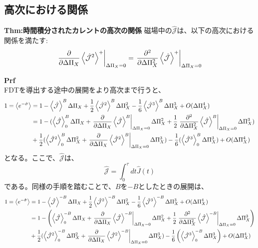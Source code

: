 \documentclass[a4paper,11pt]{jsarticle}
\begin{document}
\subsection{高次における関係}
\begin{itembox}[l]{\textbf{Thm:時間積分されたカレントの高次の関係}}
    磁場中の$\hat{\mathcal{J}}$は、以下の高次における関係を満たす:
    \begin{align}
        \left.\pdv{\Delta \Pi_X} \ev{\hat{\mathcal{J}}^2}^+\right|_{\Delta \Pi_X = 0} = \left.\pdv[2]{\Delta \Pi_X} \ev{\hat{\mathcal{J}}}^+\right|_{\Delta \Pi_X = 0}
    \end{align}

\end{itembox}
\textbf{Prf}\\
FDTを導出する途中の展開をより高次まで行うと、
\begin{align}
    1=\ev{e^{-\hat{\sigma}}}&= 1-\ev{\hat{\mathcal{J}}}^B \Delta \Pi_X + \frac{1}{2}\ev{\hat{\mathcal{J}}^2}^B \Delta \Pi_X ^2- \frac{1}{6}\ev{\hat{\mathcal{J}}^3}^B \Delta \Pi_X ^3 + O(\Delta \Pi_X ^4)\\
    &=1-(\ev{\hat{\mathcal{J}}}^B_0 \Delta \Pi_X + \left.\pdv{\Delta \Pi_X} \ev{\hat{\mathcal{J}}}^B \right|_{\Delta \Pi_X = 0} \Delta \Pi_X ^2 + \frac{1}{2}\left.\pdv[2]{\Delta \Pi_X} \ev{\hat{\mathcal{J}}}^B \right|_{\Delta \Pi_X = 0} \Delta \Pi_X ^3 )\\
    &+ \frac{1}{2}(\ev{\hat{\mathcal{J}}^2}^B_0 \Delta \Pi_X ^2 + \left.\pdv{\Delta \Pi_X} \ev{\hat{\mathcal{J}}^2}^B\right|_{\Delta \Pi_X = 0} \Delta \Pi_X ^3)- \frac{1}{6}(\ev{\hat{\mathcal{J}}^3}^B_0 \Delta \Pi_X ^3) + O(\Delta \Pi_X ^4)
\end{align}
となる。ここで、$\hat{\mathcal{J}}$は、
\begin{equation}
    \hat{\mathcal{J}} = \int_{0}^{\tau} dt \hat{J}(t)
\end{equation}
である。同様の手順を踏むことで、$B$を$-B$としたときの展開は、
\begin{align}
    1=\ev{e^{-\hat{\sigma}}}&= 1-\ev{\hat{\mathcal{J}}}^{-B} \Delta \Pi_X + \frac{1}{2}\ev{\hat{\mathcal{J}}^2}^{-B} \Delta \Pi_X ^2- \frac{1}{6}\ev{\hat{\mathcal{J}}^3}^{-B} \Delta \Pi_X ^3 + O(\Delta \Pi_X ^4)\\
    &=1-\left(\ev{\hat{\mathcal{J}}}^{-B}_0 \Delta \Pi_X + \left.\pdv{\Delta \Pi_X} \ev{\hat{\mathcal{J}}}^{-B}\right|_{\Delta \Pi_X = 0} \Delta \Pi_X ^2 + \frac{1}{2}\left.\pdv[2]{\Delta \Pi_X} \ev{\hat{\mathcal{J}}}^{-B}\right|_{\Delta \Pi_X = 0} \Delta \Pi_X ^3 \right)\\
    &+ \frac{1}{2}(\ev{\hat{\mathcal{J}}^2}^{-B}_0 \Delta \Pi_X ^2 + \left.\pdv{\Delta \Pi_X} \ev{\hat{\mathcal{J}}^2}^{-B}\right|_{\Delta \Pi_X = 0} \Delta \Pi_X ^3)- \frac{1}{6}\left(\ev{\hat{\mathcal{J}}^3}^{-B}_0 \Delta \Pi_X ^3\right) + O(\Delta \Pi_X ^4)
\end{align}
\end{document}
